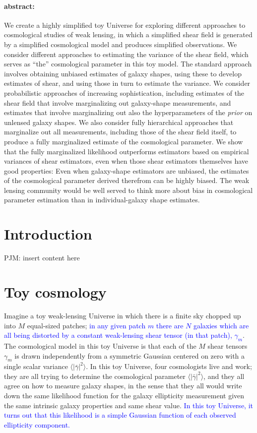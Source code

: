 \documentclass[12pt]{article}
\def\shearvar{\langle |\bar{\gamma}|^2\rangle}
\def\phil#1{\textcolor{blue}{#1}}
\begin{document}
\paragraph{abstract:}
We create a highly simplified toy Universe for exploring different
approaches to cosmological studies of weak lensing, in which a
simplified shear field is generated by a simplified cosmological model
and produces simplified observations.  We consider different
approaches to estimating the variance of the shear field, which serves
as ``the'' cosmological parameter in this toy model.  The standard
approach involves obtaining unbiased estimates of galaxy shapes, using
these to develop estimates of shear, and using those in turn to
estimate the variance.  We consider probabilistic approaches of
increasing sophistication, including estimates of the shear field that
involve marginalizing out galaxy-shape measurements, and estimates
that involve marginalizing out also the hyperparameters of the
\emph{prior} on unlensed galaxy shapes.  We also consider fully
hierarchical approaches that marginalize out all measurements,
including those of the shear field itself, to produce a fully
marginalized estimate of the cosmological parameter.  We show that the
fully marginalized likelihood outperforms estimators based on
empirical variances of shear estimators, even when those shear
estimators themselves have good properties: Even when galaxy-shape
estimators are unbiased, the estimates of the cosmological parameter
derived therefrom can be highly biased.  The weak lensing community
would be well served to think more about bias in cosmological
parameter estimation than in individual-galaxy shape estimates.

\section{Introduction}

PJM: insert content here

\section{Toy cosmology}

Imagine a toy weak-lensing Universe in which there is a finite sky chopped up
into $M$ equal-sized patches; \phil{in any given patch $m$ there are $N$
galaxies which are all being  distorted by a constant weak-lensing shear
tensor (in that patch), $\gamma_m$}.  The cosmological model in this toy
Universe is that each of the $M$ shear tensors $\gamma_m$ is drawn
independently from a symmetric Gaussian centered on zero with a single scalar
variance $\shearvar$.  In this toy Universe, four cosmologists live and work;
they are all trying to determine the cosmological parameter $\shearvar$, and
they all agree on how to measure galaxy shapes, in the sense that they all
would write down the same likelihood function for the galaxy ellipticity
measurement given the same intrinsic galaxy properties and same shear value.
\phil{In this toy Universe, it turns out that this likelihood is a simple
Gaussian function of each observed ellipticity component.}
\end{document}
